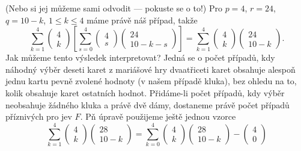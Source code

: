 \begin{example}
\begin{equation*}
    \end{equation*}
    (Nebo si jej můžeme sami odvodit — pokuste se o to!) Pro \(p = 4\), \(r = 24\), \(q = 10 - k\), 
    \(1 \leq k \leq 4\) máme právě náš případ, takže
    \begin{equation*}
      \sum^{4}_{k=1}\begin{pmatrix} 4  \\ k \end{pmatrix}
        \left[\sum^{4}_{s=0}\begin{pmatrix}  4 \\ s \end{pmatrix}
              \begin{pmatrix} 24 \\ 10 - k - s \end{pmatrix}
        \right] = 
        \sum^{4}_{k=1}\begin{pmatrix}  4 \\ k \end{pmatrix}
                      \begin{pmatrix} 24 \\ 10 - k \end{pmatrix}.
    \end{equation*}
    Jak můžeme tento výsledek interpretovat? Jedná se o počet případů, kdy náhodný výběr deseti 
    karet z mariášové hry dvaatřiceti karet obsahuje alespoň jednu kartu pevně zvolené hodnoty (v 
    našem případě kluka), bez ohledu na to, kolik obsahuje karet ostatních hodnot. Přidáme-li počet 
    případů, kdy výběr neobsahuje žádného kluka a právě dvě dámy, dostaneme právě počet případů 
    příznivých pro jev \(F\). Pň úpravě použijeme ještě jednou vzorce
    \begin{equation*}
      \sum^{4}_{k=1}\begin{pmatrix} 4 \\ k \end{pmatrix}\begin{pmatrix} 28 \\ 10 - k\end{pmatrix}
        = \sum^{4}_{k=0}\begin{pmatrix}  4 \\ k     \end{pmatrix}
                        \begin{pmatrix} 28 \\ 10 - k\end{pmatrix} -
                        \begin{pmatrix}  4 \\ 0     \end{pmatrix}

\end{equation*}
\end{example}
